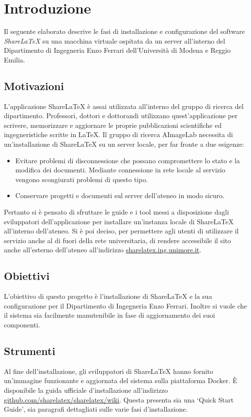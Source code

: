 \chapter{Introduzione}
\label{Introduzione}
\thispagestyle{empty}

Il seguente elaborato descrive le fasi di installazione e configurazione del software \emph{ShareLaTeX} su una macchina virtuale ospitata da un server all'interno del Dipartimento di Ingegneria Enzo Ferrari dell'Università di Modena e Reggio Emilia.

\section{Motivazioni}
L'applicazione ShareLaTeX è assai utilizzata all'interno del gruppo di ricerca del dipartimento. Professori, dottori e dottorandi utilizzano quest'applicazione per scrivere, memorizzare e aggiornare le proprie pubblicazioni scientifiche ed ingegneristiche scritte in \LaTeX. Il gruppo di ricerca AImageLab necessita di un'installazione di ShareLaTeX su un server locale, per far fronte a due esigenze:
\begin{itemize}
    \item Evitare problemi di disconnessione che possano compromettere lo stato e la modifica dei documenti. Mediante connessione in rete locale al servizio vengono scongiurati problemi di questo tipo.
    \item Conservare progetti e documenti sul server dell'ateneo in modo sicuro.
\end{itemize}
Pertanto si è pensato di sfruttare le guide e i tool messi a disposizione dagli sviluppatori dell'applicazione per installare un'instanza locale di ShareLaTeX all'interno dell'ateneo. Si è poi deciso, per permettere agli utenti di utilizzare il servizio anche al di fuori della rete universitaria, di rendere accessibile il sito anche all'esterno dell'ateneo all'indirizzo \url{sharelatex.ing.unimore.it}.

\section{Obiettivi}
L'obiettivo di questo progetto è l'installazione di ShareLaTeX e la sua configurazione per il Dipartimento di Ingegneria Enzo Ferrari. Inoltre si vuole che il sistema sia facilmente manutenibile in fase di aggiornamento dei suoi componenti.

\section{Strumenti}
Al fine dell'installazione, gli sviluppatori di ShareLaTeX hanno fornito un'immagine funzionante e aggiornata del sistema sulla piattaforma Docker. È disponibile la guida ufficiale d'installazione all'indirizzo \url{github.com/sharelatex/sharelatex/wiki}. Questa presenta sia una \enquote*{Quick Start Guide}, sia paragrafi dettagliati sulle varie fasi d'installazione.

